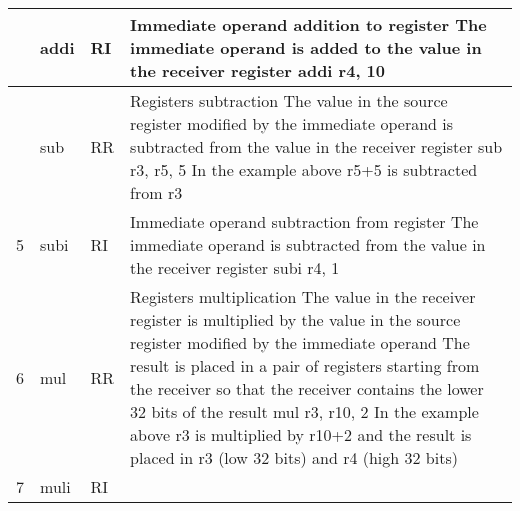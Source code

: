 \documentclass{article}
\newcommand{\St}[1]{{\fontfamily{qcr}\selectfont #1}}
\newcommand{\Ss}[1]{{\fontfamily{cmss}\selectfont #1}}
\begin{document}
{\begin{table}[h!]
\begin{tabular}{| >{\centering\arraybackslash} m{1cm} | >{\centering\arraybackslash} m{1.4cm} | >{\centering\arraybackslash} m{1.2cm} | m{11.6cm} |}
 \hline
 3 & \St{addi} & \Ss{RI} & 
 
 Immediate operand addition to register \newline
 The immediate operand is added to the value in the receiver register \newline
 \St{addi r4, 10} \\
 
 \hline
 
 4 & \St{sub} & \Ss{RR} &
 
 Registers subtraction \newline
 The value in the source register modified by the immediate operand \newline
 is subtracted from the value in the receiver register \newline
 \St{sub r3, r5, 5}
 \newline In the example above \St{r5+5} is subtracted from \St{r3} \\
 
 \hline
 
 5 & \St{subi} & \Ss{RI} &
 
 Immediate operand subtraction from register \newline
 The immediate operand is subtracted from the value in the receiver register \newline
 \St{subi r4, 1} \\
 
 \hline
 
 6 & \St{mul} & \Ss{RR} &
 
 Registers multiplication \newline
 The value in the receiver register is multiplied by the value in the source \newline
 register modified by the immediate operand \newline
 The result is placed in a pair of registers starting from the receiver \newline
 so that the receiver contains the lower 32 bits of the result \newline
 \St{mul r3, r10, 2} \newline
 In the example above \St{r3} is multiplied by \St{r10+2} and the result \newline
 is placed in \St{r3} (low 32 bits) and \St{r4} (high 32 bits) \\
 
 \hline
 
 7 & \St{muli} & \Ss{RI} &
 

\end{tabular}
\end{table}}
\end{document}
